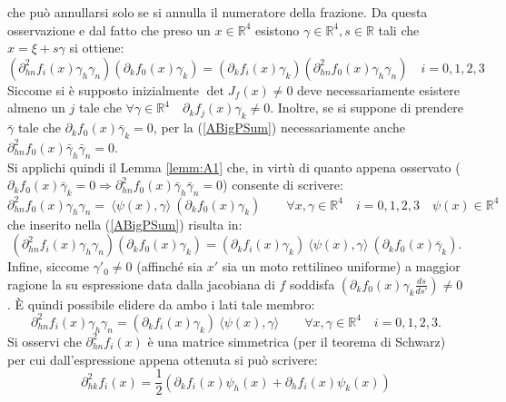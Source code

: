 che può annullarsi solo se si annulla il numeratore della frazione. Da questa osservazione e dal fatto che preso un $x\in \mathbb{R}^4 $ esistono $ \gamma \in\mathbb{R}^4, s \in \mathbb{R}$ tali che $x=\xi+s\gamma$ si ottiene:
\begin{equation}
    \left(\partial^2_{hn}f_i(x)\gamma_h\gamma_n\right)\left(\partial_kf_0(x)\gamma_k\right)
    = \left(\partial_kf_i(x)\gamma_k\right)\left(\partial^2_{hn}f_0(x)\gamma_h\gamma_n\right) \quad i=0,1,2,3  
    \label{ABigPSum}
\end{equation}
Siccome si è supposto inizialmente $\det J_f(x)\neq 0$ deve necessariamente esistere almeno un $j$ tale che $ \forall\gamma\in \mathbb{R}^4\quad\partial_kf_j(x)\gamma_k\neq 0$. Inoltre, se si suppone di prendere $\bar{\gamma}$ tale che $\partial_kf_0(x)\bar{\gamma}_k=0$, per la (\ref{ABigPSum}) necessariamente anche $\partial^2_{hn}f_0(x)\bar{\gamma}_h\bar{\gamma}_n=0$.\\

Si applichi quindi il Lemma \ref{lemm:A1} che, in virtù di quanto appena osservato ($\partial_kf_0(x)\bar{\gamma}_k=0\Rightarrow \partial^2_{hn}f_0(x)\bar{\gamma}_h\bar{\gamma}_n=0$) consente di scrivere:
\begin{equation*}
    \partial^2_{hn}f_0(x)\gamma_h\gamma_n=\ \langle \psi(x),\gamma\rangle\ (\partial_kf_0(x)\gamma_k) \qquad   \forall x,\gamma\in \mathbb{R}^4 \quad i=0,1,2,3 \quad \psi(x)\in\mathbb{R}^4
\end{equation*}
che inserito nella (\ref{ABigPSum}) risulta in:
\begin{equation*}
    \left(\partial^2_{hn}f_i(x)\gamma_h\gamma_n\right)\left(\partial_kf_0(x)\gamma_k\right)
    = \left(\partial_kf_i(x)\gamma_k\right)\ \langle \psi(x),\gamma\rangle\ (\partial_kf_0(x)\bar{\gamma}_k).
\end{equation*}
Infine, siccome $\gamma'_0\neq 0$ (affinché sia $x'$ sia un moto rettilineo uniforme) a maggior ragione la su espressione data dalla jacobiana di $f$ soddisfa $(\partial_kf_0(x)\gamma_k\frac{ds}{ds'})\neq 0$. È quindi possibile elidere da ambo i lati tale membro:
\begin{equation}
    \partial^2_{hn}f_i(x)\gamma_h\gamma_n=\left(\partial_kf_i(x)\gamma_k\right)\ \langle \psi(x),\gamma\rangle \qquad   \forall x,\gamma\in \mathbb{R}^4 \quad i=0,1,2,3.
    \label{APArtialScal}
\end{equation}
Si osservi che  $\partial^2_{hn}f_i(x)$ è una matrice simmetrica (per il teorema di Schwarz) per cui dall'espressione appena ottenuta si può scrivere:
\begin{equation}
    \partial^2_{hk}f_i(x)=\frac{1}{2}\left(\partial_kf_i(x)\psi_h(x)+\partial_hf_i(x)\psi_k(x)\right)
    \label{APArtialScalSimm}
\end{equation}

